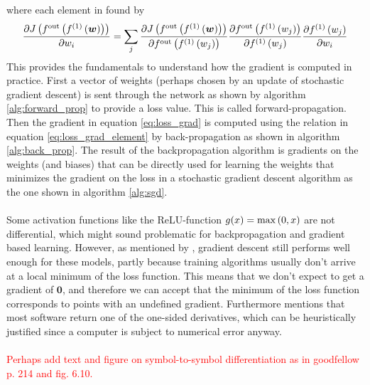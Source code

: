 where each element in found by
\begin{equation} \label{eq:loss_grad_element}
    \frac{\partial J\left (f^{\text{out}} \left (f^{(1)}\left (\boldsymbol{w}\right)\right)\right)}{\partial w_i} = \sum_j \frac{\partial J\left (f^{\text{out}} \left (f^{(1)}\left (\boldsymbol{w}\right)\right)\right)}{\partial f^{\text{out}} \left (f^{(1)}\left (w_j\right)\right)} 
    \frac{\partial f^{\text{out}} \left (f^{(1)}\left (w_j\right)\right)}{\partial f^{(1)}\left (w_j\right)} 
    \frac{\partial f^{(1)}\left (w_j\right)}{\partial w_i}
\end{equation}
This provides the fundamentals to understand how the gradient is computed in practice.
First a vector of weights (perhaps chosen by an update of stochastic gradient descent) is sent through the network as shown by algorithm \ref{alg:forward_prop} to provide a loss value. This is called forward-propagation. Then the gradient in equation \ref{eq:loss_grad} is computed using the relation in equation \ref{eq:loss_grad_element} by back-propagation as shown in algorithm \ref{alg:back_prop}. The result of the backpropagation algorithm is gradients on the weights (and biases) that can be directly used for learning the weights that minimizes the gradient on the loss in a stochastic gradient descent algorithm as the one shown in algorithm \ref{alg:sgd}.\\
\\
Some activation functions like the ReLU-function $g(x) = \max \left (0, x\right)$ are not differential, which might sound problematic for backpropagation and gradient based learning. However, as mentioned by \cite{Goodfellow-et-al-2016}, gradient descent still performs well enough for these models, partly because training algorithms usually don't arrive at a local minimum of the loss function. This means that we don't expect to get a gradient of $\boldsymbol{0}$, and therefore we can accept that the minimum of the loss function corresponds to points with an undefined gradient. Furthermore \cite{Goodfellow-et-al-2016} mentions that most software return one of the one-sided derivatives, which can be heuristically justified since a computer is subject to numerical error anyway. \\
\\
\textcolor{red}{Perhaps add text and figure on symbol-to-symbol differentiation as in goodfellow p. 214 and fig. 6.10.}


